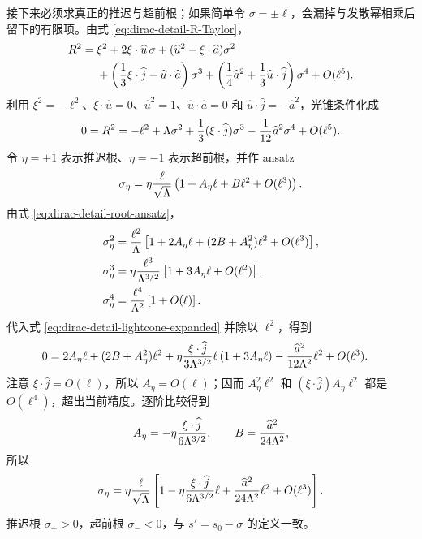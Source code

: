 接下来必须求真正的推迟与超前根；如果简单令 $\sigma=\pm\ell$，会漏掉与发散幂相乘后留下的有限项。由式 \eqref{eq:dirac-detail-R-Taylor}，
\begin{align}
 R^2
 ={}&\xi^2+2\xi\cdot \widehat u\,\sigma
 +(\widehat u^2-\xi\cdot \widehat a)\sigma^2
 \notag\\
 &+\left({1\over3}\xi\cdot \widehat j-\widehat u\cdot \widehat a\right)\sigma^3
 +\left({1\over4}\widehat a^2+{1\over3}\widehat u\cdot \widehat j\right)\sigma^4
 +O(\ell^5).
 \label{eq:dirac-detail-lightcone-unsimplified}
\end{align}
利用 $\xi^2=-\ell^2$、$\xi\cdot \widehat u=0$、$\widehat u^2=1$、$\widehat u\cdot \widehat a=0$ 和 $\widehat u\cdot \widehat j=-\widehat a^2$，光锥条件化成
\begin{equation}
 0=R^2
 =-\ell^2+\Lambda\sigma^2
 +{1\over3}(\xi\cdot \widehat j)\sigma^3
 -{1\over12}\widehat a^2\sigma^4
 +O(\ell^5).
 \label{eq:dirac-detail-lightcone-expanded}
\end{equation}
令 $\eta=+1$ 表示推迟根、$\eta=-1$ 表示超前根，并作 ansatz
\begin{equation}
 \sigma_\eta
 =\eta{\ell\over\sqrt{\Lambda}}
 \left(1+A_\eta\ell+B\ell^2+O(\ell^3)\right).
 \label{eq:dirac-detail-root-ansatz}
\end{equation}
由式 \eqref{eq:dirac-detail-root-ansatz}，
\begin{align*}
 \sigma_\eta^2
 &={\ell^2\over\Lambda}
 \left[1+2A_\eta\ell+(2B+A_\eta^2)\ell^2+O(\ell^3)\right],\\
 \sigma_\eta^3
 &=\eta{\ell^3\over\Lambda^{3/2}}
 \left[1+3A_\eta\ell+O(\ell^2)\right],\\
 \sigma_\eta^4
 &={\ell^4\over\Lambda^2}
 \left[1+O(\ell)\right].
\end{align*}
代入式 \eqref{eq:dirac-detail-lightcone-expanded} 并除以 $\ell^2$，得到
\begin{align}
 0={}&2A_\eta\ell
 +(2B+A_\eta^2)\ell^2
 +\eta{\xi\cdot \widehat j\over3\Lambda^{3/2}}\ell
 \left(1+3A_\eta\ell\right)
 -{\widehat a^2\over12\Lambda^2}\ell^2
 +O(\ell^3).
 \label{eq:dirac-detail-root-coefficient-equation}
\end{align}
注意 $\xi\cdot \widehat j=O(\ell)$，所以 $A_\eta=O(\ell)$；因而 $A_\eta^2\ell^2$ 和 $(\xi\cdot \widehat j)A_\eta\ell^2$ 都是 $O(\ell^4)$，超出当前精度。逐阶比较得到
\begin{equation*}
 A_\eta=-\eta{\xi\cdot \widehat j\over6\Lambda^{3/2}},
 \qquad
 B={\widehat a^2\over24\Lambda^2},
\end{equation*}
所以
\begin{equation}
 \sigma_\eta
 =\eta{\ell\over\sqrt{\Lambda}}
 \left[
 1-\eta{\xi\cdot \widehat j\over6\Lambda^{3/2}}\ell
 +{\widehat a^2\over24\Lambda^2}\ell^2
 +O(\ell^3)
 \right].
 \label{eq:dirac-detail-lightcone-roots}
\end{equation}
推迟根 $\sigma_{+}>0$，超前根 $\sigma_{-}<0$，与 $s'=s_0-\sigma$ 的定义一致。

